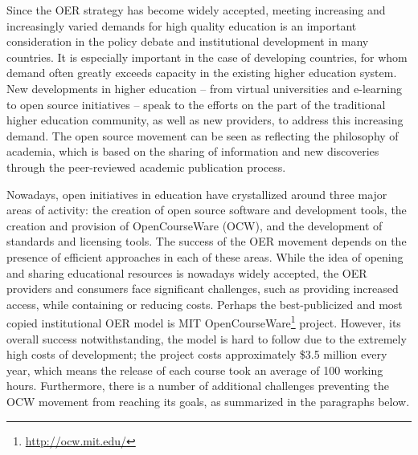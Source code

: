 \documentclass[ngerman,UKenglish,table]{scrbook}
\begin{document}
Since the OER strategy has become widely accepted, meeting increasing and increasingly varied demands for high quality education is an important consideration in the policy debate and institutional development in many countries.
It is especially important in the case of developing countries, for whom demand often greatly exceeds capacity in the existing higher education system.
New developments in higher education – from virtual universities and e-learning to open source initiatives – speak to the efforts on the part of the traditional higher education community, as well as new providers, to address this increasing demand.
The open source movement can be seen as reflecting the philosophy of academia, which is based on the sharing of information and new discoveries through the peer-reviewed academic publication process.

Nowadays, open initiatives in education have crystallized around three major areas of activity: the creation of open source software and development tools, the creation and provision of OpenCourseWare (OCW), and the development of standards and licensing tools.
The success of the OER movement depends on the presence of efficient approaches in each of these areas.
While the idea of opening and sharing educational resources is nowadays widely accepted, the OER providers and consumers face significant challenges, such as providing increased access, while containing or reducing costs.
Perhaps the best-publicized and most copied institutional OER model is MIT OpenCourseWare\footnote{\url{http://ocw.mit.edu/}} project.
However, its overall success notwithstanding, the model is hard to follow due to the extremely high costs of development; the project costs approximately \$3.5 million every year, which means the release of each course took an average of 100 working hours.
Furthermore, there is a number of additional challenges preventing the OCW movement from reaching its goals, as summarized in the paragraphs below.
\end{document}
